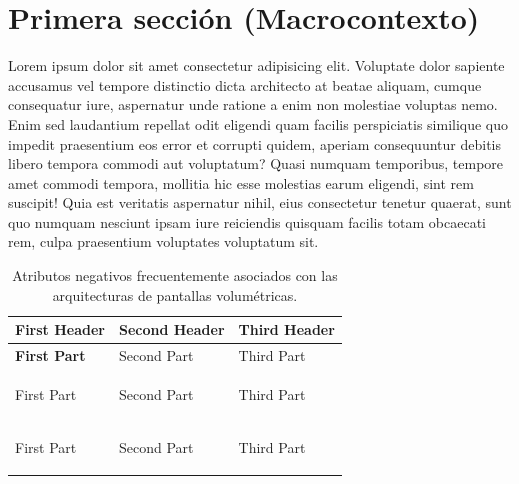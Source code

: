 \section{Primera sección (Macrocontexto)}
    \begin{sectext}
        Lorem ipsum dolor sit amet consectetur adipisicing elit. Voluptate dolor sapiente accusamus vel tempore distinctio dicta architecto at beatae aliquam, cumque consequatur iure, aspernatur unde ratione a enim non molestiae voluptas nemo. Enim sed laudantium repellat odit eligendi quam facilis perspiciatis similique quo impedit praesentium eos error et corrupti quidem, aperiam consequuntur debitis libero tempora commodi aut voluptatum? Quasi numquam temporibus, tempore amet commodi tempora, mollitia hic esse molestias earum eligendi, sint rem suscipit! Quia est veritatis aspernatur nihil, eius consectetur tenetur quaerat, sunt quo numquam nesciunt ipsam iure reiciendis quisquam facilis totam obcaecati rem, culpa praesentium voluptates voluptatum sit. 

        \begin{table}[!ht]
            \small %
            \renewcommand{\arraystretch}{1} %
            
            \caption{Atributos negativos frecuentemente asociados con las arquitecturas de pantallas volumétricas.}
            \label{tab:atributos-negativos-pantallas}

            \begin{tabularx}{\textwidth}{@{} >{\raggedright\arraybackslash\bfseries}p{3.5cm} X X @{}}
                \toprule
                \textbf{First Header} & \textbf{Second Header} & \textbf{Third Header} \\ 
                \midrule
                First Part & Second Part & Third Part \\
                \addlinespace[0.3cm]
                
                First Part & Second Part & Third Part \\
                \addlinespace[0.3cm]
                
                First Part & Second Part & Third Part \\
                \bottomrule
            \end{tabularx}
            

\end{table}
\end{sectext}
